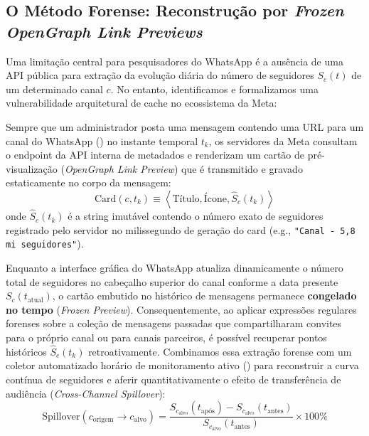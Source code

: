 \documentclass[12pt]{article}
\begin{document}
\subsection{O Método Forense: Reconstrução por \textit{Frozen OpenGraph Link Previews}}
Uma limitação central para pesquisadores do WhatsApp é a ausência de uma API pública para extração da evolução diária do número de seguidores $S_c(t)$ de um determinado canal $c$. No entanto, identificamos e formalizamos uma vulnerabilidade arquitetural de cache no ecossistema da Meta:

Sempre que um administrador posta uma mensagem contendo uma URL para um canal do WhatsApp () no instante temporal $t_k$, os servidores da Meta consultam o endpoint da API interna de metadados e renderizam um cartão de pré-visualização (\textit{OpenGraph Link Preview}) que é transmitido e gravado estaticamente no corpo da mensagem:
\begin{equation}
\text{Card}(c, t_k) \equiv \left\langle \text{Título}, \text{Ícone}, \hat{S}_c(t_k) \right\rangle
\end{equation}
onde $\hat{S}_c(t_k)$ é a string imutável contendo o número exato de seguidores registrado pelo servidor no milissegundo de geração do card (e.g., \texttt{"Canal - 5,8 mi seguidores"}).

Enquanto a interface gráfica do WhatsApp atualiza dinamicamente o número total de seguidores no cabeçalho superior do canal conforme a data presente $S_c(t_{\text{atual}})$, o cartão embutido no histórico de mensagens permanece \textbf{congelado no tempo} (\textit{Frozen Preview}). Consequentemente, ao aplicar expressões regulares forenses sobre a coleção de mensagens passadas que compartilharam convites para o próprio canal ou para canais parceiros, é possível recuperar pontos históricos $\hat{S}_c(t_k)$ retroativamente. Combinamos essa extração forense com um coletor automatizado horário de monitoramento ativo () para reconstruir a curva contínua de seguidores e aferir quantitativamente o efeito de transferência de audiência (\textit{Cross-Channel Spillover}):
\begin{equation}
\text{Spillover}(c_{\text{origem}} \rightarrow c_{\text{alvo}}) = \frac{S_{c_{\text{alvo}}}(t_{\text{após}}) - S_{c_{\text{alvo}}}(t_{\text{antes}})}{S_{c_{\text{alvo}}}(t_{\text{antes}})} \times 100\%
\end{equation}
\end{document}

